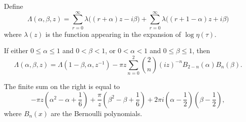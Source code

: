 Define
$$\Lambda(\alpha, \beta, z) = \sum_{r=0}^{\infty} \lambda\bigl((r + \alpha)z - i\beta\bigr) + \sum_{r=0}^{\infty} \lambda\bigl((r + 1 - \alpha)z + i\beta\bigr)$$
where $\lambda(z)$ is the function appearing in the expansion of $\log\eta(\tau)$.

If either $0 \leq \alpha \leq 1$ and $0 < \beta < 1$, or $0 < \alpha < 1$ and $0 \leq \beta \leq 1$, then
$$\Lambda(\alpha, \beta, z) = \Lambda(1 - \beta, \alpha, z^{-1}) - \pi z \sum_{n=0}^{2} \binom{2}{n} (iz)^{-n} B_{2-n}(\alpha) B_n(\beta).$$

The finite sum on the right is equal to
$$-\pi z \left( \alpha^2 - \alpha + \frac{1}{6} \right) + \frac{\pi}{z} \left( \beta^2 - \beta + \frac{1}{6} \right) + 2\pi i \left( \alpha - \frac{1}{2} \right) \left( \beta - \frac{1}{2} \right),$$
where $B_n(x)$ are the Bernoulli polynomials.

